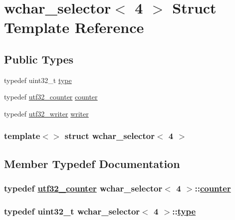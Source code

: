 \hypertarget{structwchar__selector_3_014_01_4}{
\section{wchar\_\-selector$<$ 4 $>$ Struct Template Reference}
\label{structwchar__selector_3_014_01_4}
}
\subsection*{Public Types}
\begin{CompactItemize}
\item 
typedef uint32\_\-t \hyperlink{structwchar__selector_3_014_01_4_f45ac603ab6fefec66e5c29044b4eed6}{type}
\item 
typedef \hyperlink{structutf32__counter}{utf32\_\-counter} \hyperlink{structwchar__selector_3_014_01_4_7d7c585ae0819660112b8c8683971b97}{counter}
\item 
typedef \hyperlink{structutf32__writer}{utf32\_\-writer} \hyperlink{structwchar__selector_3_014_01_4_48042e7fe51c4661397ae7afe3905243}{writer}
\end{CompactItemize}
\subsubsection*{template$<$$>$ struct wchar\_\-selector$<$ 4 $>$}



\subsection{Member Typedef Documentation}
\hypertarget{structwchar__selector_3_014_01_4_7d7c585ae0819660112b8c8683971b97}{
\subsubsection[counter]{\setlength{\rightskip}{0pt plus 5cm}typedef \hyperlink{structutf32__counter}{utf32\_\-counter} wchar\_\-selector$<$ 4 $>$::\hyperlink{structutf32__counter}{counter}}}
\label{structwchar__selector_3_014_01_4_7d7c585ae0819660112b8c8683971b97}


\hypertarget{structwchar__selector_3_014_01_4_f45ac603ab6fefec66e5c29044b4eed6}{
\subsubsection[type]{\setlength{\rightskip}{0pt plus 5cm}typedef uint32\_\-t wchar\_\-selector$<$ 4 $>$::\hyperlink{structwchar__selector_3_014_01_4_f45ac603ab6fefec66e5c29044b4eed6}{type}}}
\label{structwchar__selector_3_014_01_4_f45ac603ab6fefec66e5c29044b4eed6}


